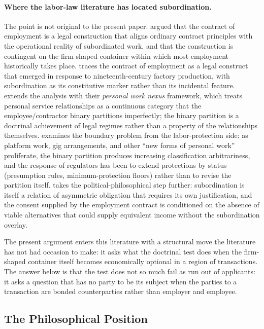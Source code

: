 \documentclass[11pt,a4paper]{article}
\theoremstyle{remark}
\begin{document}
\paragraph{Where the labor-law literature has located subordination.}
The point is not original to the present paper.
\citet{collins1986employment} argued that the contract of
employment is a legal construction that aligns ordinary contract
principles with the operational reality of subordinated work, and
that the construction is contingent on the firm-shaped container
within which most employment historically takes place.
\citet{deakin2001changing, deakin_morris_2012} traces the
contract of employment as a legal construct that emerged in
response to nineteenth-century factory production, with
subordination as its constitutive marker rather than its
incidental feature. \citet{freedland_kountouris_2011} extends the
analysis with their \emph{personal work nexus} framework, which
treats personal service relationships as a continuous category
that the employee/contractor binary partitions imperfectly; the
binary partition is a doctrinal achievement of legal regimes
rather than a property of the relationships themselves.
\citet{fudge2006new} examines the boundary problem from the
labor-protection side: as platform work, gig arrangements, and
other ``new forms of personal work'' proliferate, the binary
partition produces increasing classification arbitrariness, and
the response of regulators has been to extend protections by
status (presumption rules, minimum-protection floors) rather than
to revise the partition itself. \citet{veitch2017obligations}
takes the political-philosophical step further: subordination is
itself a relation of asymmetric obligation that requires its own
justification, and the consent supplied by the employment
contract is conditioned on the absence of viable alternatives that
could supply equivalent income without the subordination overlay.

The present argument enters this literature with a structural
move the literature has not had occasion to make: it asks what
the doctrinal test does when the firm-shaped container itself
becomes economically optional in a region of transactions. The
answer below is that the test does not so much fail as run out of
applicants: it asks a question that has no party to be its
subject when the parties to a transaction are bonded
counterparties rather than employer and employee.

\subsection{The Philosophical Position}
\end{document}
